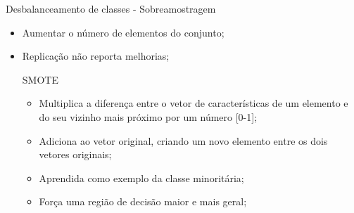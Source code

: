 \documentclass{beamer}
\begin{document}
\begin{frame}{Desbalanceamento de classes - Sobreamostragem}
    \begin{itemize}
        \item Aumentar o número de elementos do conjunto;
        \item Replicação não reporta melhorias;
    \begin{block}{SMOTE}
    \justifying
        \begin{itemize}
            \item Multiplica a diferença entre o vetor de características de um elemento e do seu vizinho mais próximo por um número [0-1];
            \item Adiciona ao vetor original, criando um novo elemento entre os dois vetores originais;
            \item Aprendida como exemplo da classe minoritária;
            \item Força uma região de decisão maior e mais geral;
        \end{itemize}
    \end{block}
    \end{itemize}







\end{frame}
\end{document}
